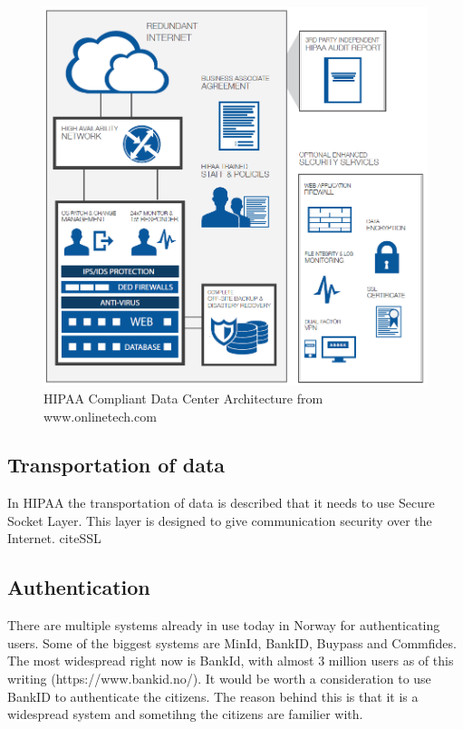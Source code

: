\begin{figure}[H]
\centering
\includegraphics[scale=0.50]{../Figures/hipaa.png}
\caption{HIPAA Compliant Data Center Architecture from www.onlinetech.com}
\label{figure:HIPAA}
\end{figure}


\subsection{Transportation of data}
In HIPAA the transportation of data is described that it needs to use Secure Socket Layer. 
This layer is designed to give communication security over the Internet. cite{SSL}


\subsection{Authentication}
There are multiple systems already in use today in Norway for authenticating users. 
Some of the biggest systems are MinId, BankID, Buypass and Commfides.
The most widespread right now is BankId, with almost 3 million users as of this writing (https://www.bankid.no/).
It would be worth a consideration to use BankID to authenticate the citizens. 
The reason behind this is that it is a widespread system and sometihng the citizens are familier with. 

